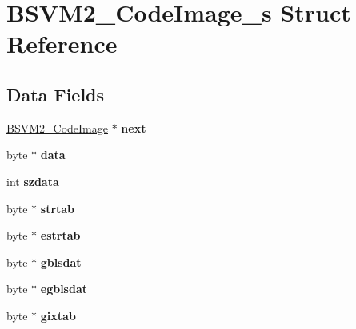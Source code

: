 \hypertarget{structBSVM2__CodeImage__s}{\section{B\-S\-V\-M2\-\_\-\-Code\-Image\-\_\-s Struct Reference}
\label{structBSVM2__CodeImage__s}
}
\subsection*{Data Fields}
\begin{DoxyCompactItemize}
\item 
\hypertarget{structBSVM2__CodeImage__s_a60d7d0fc98bb48efbdd403a7ea591df5}{\hyperlink{structBSVM2__CodeImage__s}{B\-S\-V\-M2\-\_\-\-Code\-Image} $\ast$ {\bfseries next}}\label{structBSVM2__CodeImage__s_a60d7d0fc98bb48efbdd403a7ea591df5}

\item 
\hypertarget{structBSVM2__CodeImage__s_a1a62fe22ea21c66b6a4d9f9f9642bd7c}{byte $\ast$ {\bfseries data}}\label{structBSVM2__CodeImage__s_a1a62fe22ea21c66b6a4d9f9f9642bd7c}

\item 
\hypertarget{structBSVM2__CodeImage__s_abad0869e84656dedb7f59843f57df90e}{int {\bfseries szdata}}\label{structBSVM2__CodeImage__s_abad0869e84656dedb7f59843f57df90e}

\item 
\hypertarget{structBSVM2__CodeImage__s_a244cdcb87614c3b902a9a96e75b2ba2f}{byte $\ast$ {\bfseries strtab}}\label{structBSVM2__CodeImage__s_a244cdcb87614c3b902a9a96e75b2ba2f}

\item 
\hypertarget{structBSVM2__CodeImage__s_aeeb3155b79ae0d95a20b0a62310ba3b0}{byte $\ast$ {\bfseries estrtab}}\label{structBSVM2__CodeImage__s_aeeb3155b79ae0d95a20b0a62310ba3b0}

\item 
\hypertarget{structBSVM2__CodeImage__s_a5d03d75f65ed26e8399cb95774ea76ec}{byte $\ast$ {\bfseries gblsdat}}\label{structBSVM2__CodeImage__s_a5d03d75f65ed26e8399cb95774ea76ec}

\item 
\hypertarget{structBSVM2__CodeImage__s_a5191dada430a9e6248e52a311dd32177}{byte $\ast$ {\bfseries egblsdat}}\label{structBSVM2__CodeImage__s_a5191dada430a9e6248e52a311dd32177}

\item 
\hypertarget{structBSVM2__CodeImage__s_af7af7d1705bd3fa11129c0b194755a97}{byte $\ast$ {\bfseries gixtab}}\label{structBSVM2__CodeImage__s_af7af7d1705bd3fa11129c0b194755a97}


\end{DoxyCompactItemize}
